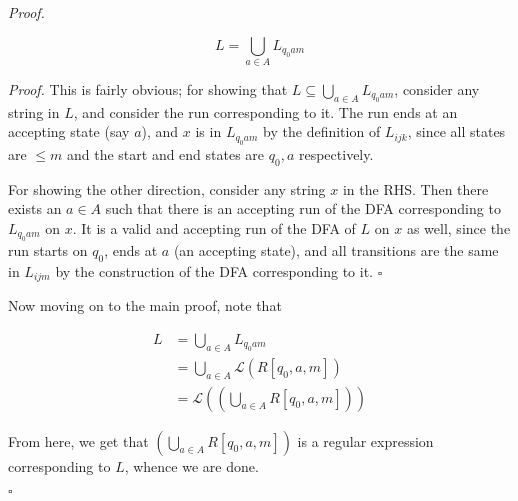 \documentclass[a4paper]{article}
\newenvironment{proof}{\begin{breakbox}\textit{Proof.}}{\hfill$\square$\end{breakbox}}
\newcommand{\mc}{\mathcal}
\renewcommand{\L}{\mc{L}}
\begin{document}
\begin{proof}
	\begin{claim}
		$$L = \bigcup_{a\in A} L_{q_0am}$$
	\end{claim}

	\begin{proof}
		This is fairly obvious; for showing that $\displaystyle L \subseteq \bigcup_{a\in A} L_{q_0am}$, consider any string in $L$, and consider the run corresponding to it. The run ends at an
		accepting state (say $a$), and $x$ is in $L_{q_0am}$ by the definition of $L_{ijk}$, since all states are $\le m$ and the start and end states are $q_0, a$ respectively.

		For showing the other direction, consider any string $x$ in the RHS. Then there exists an $a \in A$ such that there is an accepting run of the DFA corresponding to $L_{q_0am}$ on $x$. It is a
		valid and accepting run of the DFA of $L$ on $x$ as well, since the run starts on $q_0$, ends at $a$ (an accepting state), and all transitions are the same in $L_{ijm}$ by the construction of the DFA
		corresponding to it.
	\end{proof}

	Now moving on to the main proof, note that

	\begin{align*}
		L & = \bigcup_{a\in A} L_{q_0am}                                 \\
		  & = \bigcup_{a \in A} \L(R[q_0, a, m])                         \\
		  & = \L\left(\left(\bigcup_{a \in A} R[q_0, a, m]\right)\right)
	\end{align*}

	From here, we get that $\displaystyle \left(\bigcup_{a \in A} R[q_0, a, m]\right)$ is a regular expression corresponding to $L$, whence we are done.

\end{proof}
\end{document}
